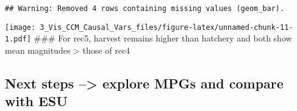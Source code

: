 \documentclass[
]{article}
\begin{document}
\begin{verbatim}
## Warning: Removed 4 rows containing missing values (geom_bar).
\end{verbatim}

\texttt{[image: 3\_Vis\_CCM\_Causal\_Vars\_files/figure-latex/unnamed-chunk-11-1.pdf]}
\#\#\# For rec5, harvest remains higher than hatchery and both show mean
magnitudes \textgreater{} those of rec4

\hypertarget{next-steps-explore-mpgs-and-compare-with-esu}{%
\subsection{Next steps --\textgreater{} explore MPGs and compare with
ESU}\label{next-steps-explore-mpgs-and-compare-with-esu}}
\end{document}
